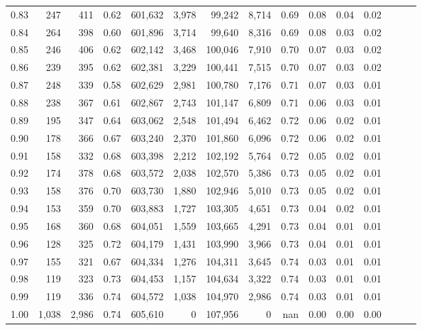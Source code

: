 \begin{tabular}{rrrrrrrrrrrrrrr}
0.83 &     247 &    411 &  0.62 &  601,632 &    3,978 &   99,242 &    8,714 &  0.69 &  0.08 &  0.04 &      0.02 \\
0.84 &     264 &    398 &  0.60 &  601,896 &    3,714 &   99,640 &    8,316 &  0.69 &  0.08 &  0.03 &      0.02 \\
0.85 &     246 &    406 &  0.62 &  602,142 &    3,468 &  100,046 &    7,910 &  0.70 &  0.07 &  0.03 &      0.02 \\
0.86 &     239 &    395 &  0.62 &  602,381 &    3,229 &  100,441 &    7,515 &  0.70 &  0.07 &  0.03 &      0.02 \\
0.87 &     248 &    339 &  0.58 &  602,629 &    2,981 &  100,780 &    7,176 &  0.71 &  0.07 &  0.03 &      0.01 \\
0.88 &     238 &    367 &  0.61 &  602,867 &    2,743 &  101,147 &    6,809 &  0.71 &  0.06 &  0.03 &      0.01 \\
0.89 &     195 &    347 &  0.64 &  603,062 &    2,548 &  101,494 &    6,462 &  0.72 &  0.06 &  0.02 &      0.01 \\
0.90 &     178 &    366 &  0.67 &  603,240 &    2,370 &  101,860 &    6,096 &  0.72 &  0.06 &  0.02 &      0.01 \\
0.91 &     158 &    332 &  0.68 &  603,398 &    2,212 &  102,192 &    5,764 &  0.72 &  0.05 &  0.02 &      0.01 \\
0.92 &     174 &    378 &  0.68 &  603,572 &    2,038 &  102,570 &    5,386 &  0.73 &  0.05 &  0.02 &      0.01 \\
0.93 &     158 &    376 &  0.70 &  603,730 &    1,880 &  102,946 &    5,010 &  0.73 &  0.05 &  0.02 &      0.01 \\
0.94 &     153 &    359 &  0.70 &  603,883 &    1,727 &  103,305 &    4,651 &  0.73 &  0.04 &  0.02 &      0.01 \\
0.95 &     168 &    360 &  0.68 &  604,051 &    1,559 &  103,665 &    4,291 &  0.73 &  0.04 &  0.01 &      0.01 \\
0.96 &     128 &    325 &  0.72 &  604,179 &    1,431 &  103,990 &    3,966 &  0.73 &  0.04 &  0.01 &      0.01 \\
0.97 &     155 &    321 &  0.67 &  604,334 &    1,276 &  104,311 &    3,645 &  0.74 &  0.03 &  0.01 &      0.01 \\
0.98 &     119 &    323 &  0.73 &  604,453 &    1,157 &  104,634 &    3,322 &  0.74 &  0.03 &  0.01 &      0.01 \\
0.99 &     119 &    336 &  0.74 &  604,572 &    1,038 &  104,970 &    2,986 &  0.74 &  0.03 &  0.01 &      0.01 \\
1.00 &   1,038 &  2,986 &  0.74 &  605,610 &        0 &  107,956 &        0 &   nan &  0.00 &  0.00 &      0.00 \\
\bottomrule
\end{tabular}
